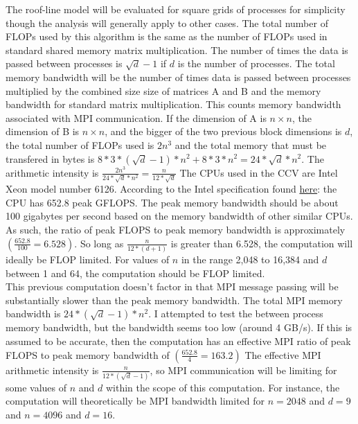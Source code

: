 \documentclass{article}
\begin{document}
The roof-line model will be evaluated for square grids of processes for simplicity though the analysis
will generally apply to other cases.
The total number of FLOPs used by this algorithm is the same as the number of FLOPs used in standard
shared memory matrix multiplication. The number of times the data is passed between processes is
$\sqrt{d} - 1$ if $d$ is the number of processes. The total memory bandwidth will be the number
of times data is passed between processes multiplied by the combined size
size of matrices A and B and the memory bandwidth for standard matrix multiplication. This counts memory
bandwidth associated with MPI communication.
If the dimension of A is $n \times n$, the dimension of B is $n \times n$, and the bigger of the two
previous block dimensions is $d$, the total number of FLOPs
used is $2 n^3$ and the total memory that must be transfered in bytes is 
$ 8 * 3 * (\sqrt{d} - 1) * n^2 + 8 * 3 * n^2 = 24 * \sqrt{d} * n^2$. The arithmetic intensity is 
$\frac{2 n^3}{24 * \sqrt{d} * n^2} = \frac{n}{12 * \sqrt{d}}$ The CPUs used in the CCV are Intel Xeon 
model number 6126. According to the Intel specification found 
\href{https://www.intel.com/content/www/us/en/support/articles/000005755/processors.html}{here}: 
the CPU has 652.8 
peak GFLOPS. The peak memory bandwidth should be about 100 gigabytes per second based on the
memory bandwidth of other similar CPUs. As such, the ratio of peak FLOPS to peak memory bandwidth 
is approximately $(\frac{652.8}{100} = 6.528)$. So long as $\frac{n}{12 * (d + 1)}$ is greater
than 6.528, the computation will ideally be FLOP limited. For values of $n$ in the range
2,048 to 16,384 and $d$ between 1 and 64, the computation should be FLOP limited. \\

This previous computation doesn't factor in that MPI message passing will be substantially slower than
the peak memory bandwidth. The total MPI memory bandwidth is $24 * (\sqrt{d} - 1)  * n^2$. I attempted to test the 
between process memory bandwidth, but the bandwidth seems too low (around 4 GB/s). If this 
is assumed to be accurate, then the computation has an effective MPI ratio of peak FLOPS to 
peak memory bandwidth of $(\frac{652.8}{4} = 163.2)$  The effective MPI arithmetic intensity
is $\frac{n}{12 * (\sqrt{d} - 1)}$, so MPI communication will be limiting for some values of $n$ and $d$
within the scope of this computation. For instance, the computation will theoretically be MPI bandwidth
limited for $n = 2048$ and $d = 9$ and $n = 4096$ and $d = 16$.
\end{document}
